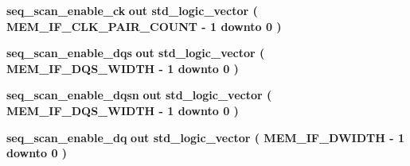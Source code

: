 \begin{DoxyCompactItemize}
\item 
{\bf seq\+\_\+scan\+\_\+enable\+\_\+ck}  {\bfseries {\bfseries \textcolor{keywordflow}{out}\textcolor{vhdlchar}{ }}} {\bfseries \textcolor{comment}{std\+\_\+logic\+\_\+vector}\textcolor{vhdlchar}{ }\textcolor{vhdlchar}{(}\textcolor{vhdlchar}{ }\textcolor{vhdlchar}{ }\textcolor{vhdlchar}{ }\textcolor{vhdlchar}{ }{\bfseries {\bf M\+E\+M\+\_\+\+I\+F\+\_\+\+C\+L\+K\+\_\+\+P\+A\+I\+R\+\_\+\+C\+O\+U\+NT}} \textcolor{vhdlchar}{-\/}\textcolor{vhdlchar}{ } \textcolor{vhdldigit}{1} \textcolor{vhdlchar}{ }\textcolor{keywordflow}{downto}\textcolor{vhdlchar}{ }\textcolor{vhdlchar}{ } \textcolor{vhdldigit}{0} \textcolor{vhdlchar}{ }\textcolor{vhdlchar}{)}\textcolor{vhdlchar}{ }} 
\item 
{\bf seq\+\_\+scan\+\_\+enable\+\_\+dqs}  {\bfseries {\bfseries \textcolor{keywordflow}{out}\textcolor{vhdlchar}{ }}} {\bfseries \textcolor{comment}{std\+\_\+logic\+\_\+vector}\textcolor{vhdlchar}{ }\textcolor{vhdlchar}{(}\textcolor{vhdlchar}{ }\textcolor{vhdlchar}{ }\textcolor{vhdlchar}{ }\textcolor{vhdlchar}{ }{\bfseries {\bf M\+E\+M\+\_\+\+I\+F\+\_\+\+D\+Q\+S\+\_\+\+W\+I\+D\+TH}} \textcolor{vhdlchar}{-\/}\textcolor{vhdlchar}{ } \textcolor{vhdldigit}{1} \textcolor{vhdlchar}{ }\textcolor{keywordflow}{downto}\textcolor{vhdlchar}{ }\textcolor{vhdlchar}{ } \textcolor{vhdldigit}{0} \textcolor{vhdlchar}{ }\textcolor{vhdlchar}{)}\textcolor{vhdlchar}{ }} 
\item 
{\bf seq\+\_\+scan\+\_\+enable\+\_\+dqsn}  {\bfseries {\bfseries \textcolor{keywordflow}{out}\textcolor{vhdlchar}{ }}} {\bfseries \textcolor{comment}{std\+\_\+logic\+\_\+vector}\textcolor{vhdlchar}{ }\textcolor{vhdlchar}{(}\textcolor{vhdlchar}{ }\textcolor{vhdlchar}{ }\textcolor{vhdlchar}{ }\textcolor{vhdlchar}{ }{\bfseries {\bf M\+E\+M\+\_\+\+I\+F\+\_\+\+D\+Q\+S\+\_\+\+W\+I\+D\+TH}} \textcolor{vhdlchar}{-\/}\textcolor{vhdlchar}{ } \textcolor{vhdldigit}{1} \textcolor{vhdlchar}{ }\textcolor{keywordflow}{downto}\textcolor{vhdlchar}{ }\textcolor{vhdlchar}{ } \textcolor{vhdldigit}{0} \textcolor{vhdlchar}{ }\textcolor{vhdlchar}{)}\textcolor{vhdlchar}{ }} 
\item 
{\bf seq\+\_\+scan\+\_\+enable\+\_\+dq}  {\bfseries {\bfseries \textcolor{keywordflow}{out}\textcolor{vhdlchar}{ }}} {\bfseries \textcolor{comment}{std\+\_\+logic\+\_\+vector}\textcolor{vhdlchar}{ }\textcolor{vhdlchar}{(}\textcolor{vhdlchar}{ }\textcolor{vhdlchar}{ }\textcolor{vhdlchar}{ }\textcolor{vhdlchar}{ }{\bfseries {\bf M\+E\+M\+\_\+\+I\+F\+\_\+\+D\+W\+I\+D\+TH}} \textcolor{vhdlchar}{-\/}\textcolor{vhdlchar}{ } \textcolor{vhdldigit}{1} \textcolor{vhdlchar}{ }\textcolor{keywordflow}{downto}\textcolor{vhdlchar}{ }\textcolor{vhdlchar}{ } \textcolor{vhdldigit}{0} \textcolor{vhdlchar}{ }\textcolor{vhdlchar}{)}\textcolor{vhdlchar}{ }} 

\end{DoxyCompactItemize}

